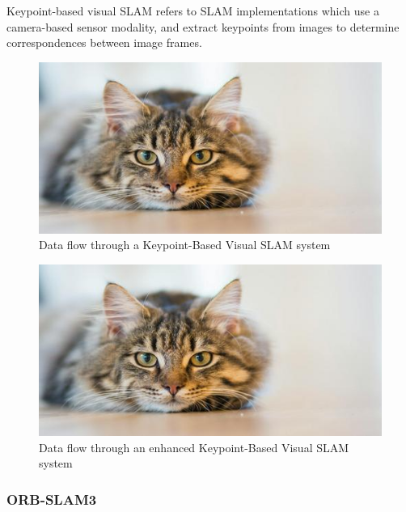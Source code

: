 Keypoint-based visual SLAM refers to SLAM implementations which use a camera-based sensor modality, and extract keypoints from images to determine correspondences between image frames.

\begin{figure}[ht!]
    \includegraphics[width=\textwidth]{resources/placeholder.jpeg}
    \caption{Data flow through a Keypoint-Based Visual SLAM system}
    \label{fig:keypoint_visual_slam_pipeline}
\end{figure}


\begin{figure}[ht!]
    \includegraphics[width=\textwidth]{resources/placeholder.jpeg}
    \caption{Data flow through an enhanced Keypoint-Based Visual SLAM system}
    \label{fig:enhanced_keypoint_visual_slam_pipeline}
\end{figure}


\subsubsection{ORB-SLAM3}

